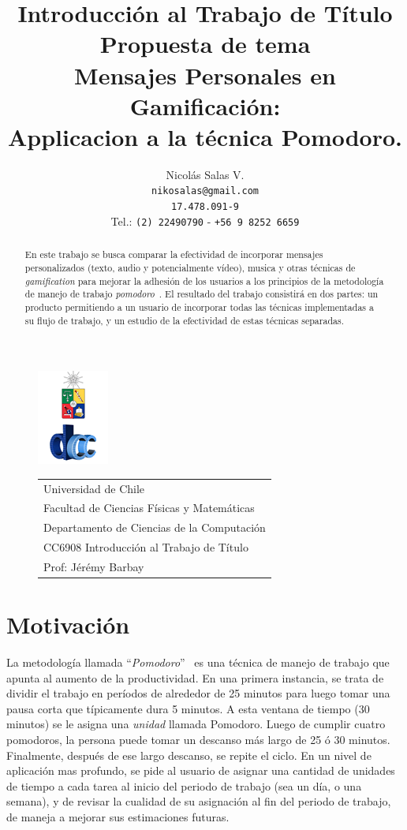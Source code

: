 \documentclass[12pt,letterpaper]{report}
\title{
{\small Introducción al Trabajo de Título \\  Propuesta de tema}
\\
{\Huge 
Mensajes Personales en Gamificación:\\
Applicacion a la técnica  Pomodoro.} 
}
\author{Nicolás Salas V.\\\texttt{nikosalas@gmail.com}\\\texttt{17.478.091-9}\\Tel.: \texttt{(2) 22490790} - \texttt{+56 9 8252 6659}}
\begin{document}
\begin{figure}[t]
\includegraphics[scale=0.83]{logo.png}
\begin{tabular}{l}
\small Universidad de Chile\\
\small Facultad de Ciencias Físicas y Matemáticas\\
\small Departamento de Ciencias de la Computación\\
\small CC6908 Introducción al Trabajo de Título\\
\small Prof: Jérémy Barbay
\vspace{2.3cm}
\end{tabular}
\end{figure}
\maketitle

\begin{abstract}
En este trabajo se busca comparar la efectividad de incorporar mensajes personalizados (texto, audio y potencialmente vídeo), musica y otras técnicas de \emph{gamification} para mejorar la adhesión de los usuarios a los principios de la metodología de manejo de trabajo \emph{pomodoro}~\cite{cirillo2009pomodoro}. El resultado del trabajo consistirá en dos partes: un producto permitiendo a un usuario de incorporar todas las técnicas implementadas a su flujo de trabajo, y  un estudio de la efectividad de estas técnicas separadas.
\end{abstract}

\tableofcontents
\newpage

\hypertarget{motivaciuxf3n}{%
\section{Motivación}\label{motivaciuxf3n}}

La metodología llamada ``\emph{Pomodoro}''~\cite{cirillo2009pomodoro} es una técnica de manejo de trabajo que apunta al aumento de la productividad. En una primera instancia, se trata de dividir el trabajo en períodos de alrededor de 25 minutos para luego tomar una pausa corta que típicamente dura 5 minutos. A esta ventana de tiempo (30 minutos) se le asigna una \emph{unidad} llamada Pomodoro.  Luego de cumplir cuatro pomodoros, la persona puede tomar un descanso más largo de 25 ó 30 minutos. Finalmente, después de ese largo descanso, se repite el ciclo. En un nivel de aplicación mas profundo, se pide al usuario de asignar una cantidad de unidades de tiempo a cada tarea al inicio del periodo de trabajo (sea un día, o una semana), y de revisar la cualidad de su asignación al fin del periodo de trabajo, de maneja a mejorar sus estimaciones futuras.
\end{document}
